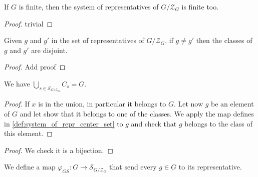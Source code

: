 \begin{proposition}
    \label{prop:system_of_repr_center_set_finite}
    \leanok
    If $G$ is finite, then the system of representatives of $G/\mathcal{Z}_G$ is finite too.
\end{proposition}
\begin{proof}
    \leanok
    trivial
\end{proof}

\begin{proposition}
    \label{prop:system_of_repr_center_set_classes_disjoints}
    \leanok
    Given $g$ and $g'$ in the set of representatives of $G/\mathcal{Z}_G$, if $g\ne g'$
    then the classes of $g$ and $g'$ are disjoint.
\end{proposition}
\begin{proof}
    Add proof
\end{proof}

\begin{proposition}
    \label{prop:system_of_repr_center_set_union}
    \leanok
    We have $\bigcup\limits_{s\in \mathcal{S}_{G/\mathcal{Z}_G}} C_s= G$.
\end{proposition}
\begin{proof}
    \leanok
    If $x$ is in the union, in particular it belongs to $G$. Let now $g$ be an element of $G$
    and let show that it belongs to one of the classes. We apply the map defines in \ref{def:system_of_repr_center_set}
    to $g$ and check that $g$ belongs to the class of this element.
\end{proof}

\begin{proposition}
    \label{def:system_of_repr_center_set_bij}
    \leanok
    We have a bijection between $\mathcal{S}_{G/\mathcal{Z}_G}$ and $\{\bar{g} \in G/\mathcal{Z}_G}$
    given by the map $s\to \bar{s}$.
\end{proposition}
\begin{proof}
    \leanok
    We check it is a bijection.
\end{proof}

\begin{definition}
    \label{def:G_to_syst}
    \leanok
    We define a map $\varphi_{G\mathcal{S}} : G \rightarrow \mathcal{S}_{G/\mathcal{Z}_G}$ that
    send every $g\in G$ to its representative.
\end{definition}

